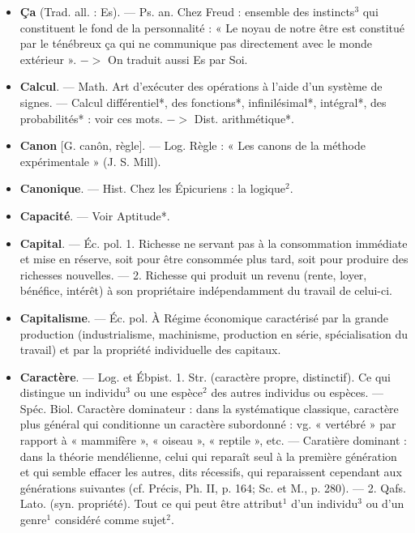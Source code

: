 
	\begin{itemize}[leftmargin=1cm, label=, itemsep=11pt]

\item {\bf Ça} (Trad. all. : Es). — Ps. an. Chez
Freud : ensemble des instincts$^3$ qui
constituent le fond de la personnalité :
« Le noyau de notre être est constitué
par le ténébreux ça qui ne communique pas directement avec le
monde extérieur ». $->$ On traduit
aussi Es par Soi.

\item {\bf Calcul}. — Math. Art d'exécuter des
opérations à l’aide d’un système de
signes. — Calcul différentiel*, des
fonctions*, infinilésimal*, intégral*,
des probabilités* : voir ces mots.
$->$ Dist. arithmétique*.

\item {\bf Canon} [G. canôn, règle]. — Log.
Règle : « Les canons de la méthode
expérimentale » (J. S. Mill).

\item {\bf Canonique}. — Hist. Chez les Épicuriens : la logique$^2$.

\item {\bf Capacité}. — Voir Aptitude*.

\item {\bf Capital}. — Éc. pol. 1. Richesse ne
servant pas à la consommation
immédiate et mise en réserve, soit
pour être consommée plus tard, soit
pour produire des richesses nouvelles. — 2. Richesse qui produit un
revenu (rente, loyer, bénéfice, intérêt) à son propriétaire indépendamment du travail de celui-ci.

\item {\bf Capitalisme}. — Éc. pol. À Régime économique caractérisé par la grande
production (industrialisme, machinisme, production en série, spécialisation
du travail) et par la propriété individuelle des capitaux.

\item {\bf Caractère}. — Log. et Ébpist. 1. Str.
(caractère propre, distinctif). Ce qui
distingue un individu$^3$ ou une espèce$^2$
des autres individus ou espèces. —
Spéc. Biol. Caractère dominateur :
dans la systématique classique,
caractère plus général qui conditionne un caractère subordonné : vg.
« vertébré » par rapport à « mammifère », « oiseau », « reptile », etc. —
Caratière dominant : dans la théorie
mendélienne, celui qui reparaît seul
à la première génération et qui
semble effacer les autres, dits récessifs, qui reparaissent cependant aux
générations suivantes (cf. Précis,
Ph. II, p. 164; Sc. et M., p. 280). —
2. Qafs. Lato. (syn. propriété). Tout
ce qui peut être attribut$^1$ d’un individu$^3$ ou d’un genre$^1$ considéré
comme sujet$^2$.


\end{itemize}
